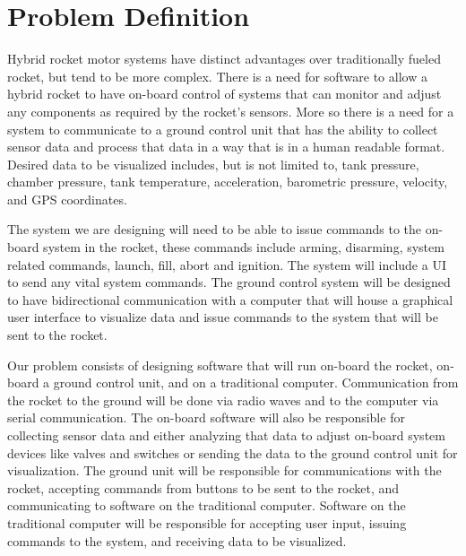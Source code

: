\documentclass[12pt]{report}
\begin{document}
\section{Problem Definition}
\sectionfont{\scshape}
Hybrid rocket motor systems have distinct advantages over traditionally fueled rocket, but tend to be more complex. There is a need for software to allow a hybrid rocket to have on-board control of systems that can monitor and adjust any components as required by the rocket's sensors.  More so there is a need for a system to communicate to a ground control unit that has the ability to collect sensor data and process that data in a way that is in a human readable format. Desired data to be visualized includes, but is not limited to, tank pressure, chamber pressure, tank temperature, acceleration, barometric pressure, velocity, and GPS coordinates.\par
The system we are designing will need to be able to issue commands to the on-board system in the rocket, these commands include arming, disarming, system related commands, launch, fill, abort and ignition. The system will include a UI to send any vital system commands. The ground control system will be designed to have bidirectional communication with a computer that will house a graphical user interface to visualize data and issue commands to the system that will be sent to the rocket.\par
Our problem consists of designing software that will run on-board the rocket, on-board a ground control unit, and on a traditional computer. Communication from the rocket to the ground will be done via radio waves and to the computer via serial communication. The on-board software will also be responsible for collecting sensor data and either analyzing that data to adjust on-board system devices like valves and switches or sending the data to the ground control unit for visualization.  The ground unit will  be responsible for communications with the rocket, accepting commands from buttons to be sent to the rocket, and communicating to software on the traditional computer. Software on the traditional computer will be responsible for accepting user input, issuing commands to the system, and receiving data to be visualized.
\end{document}
